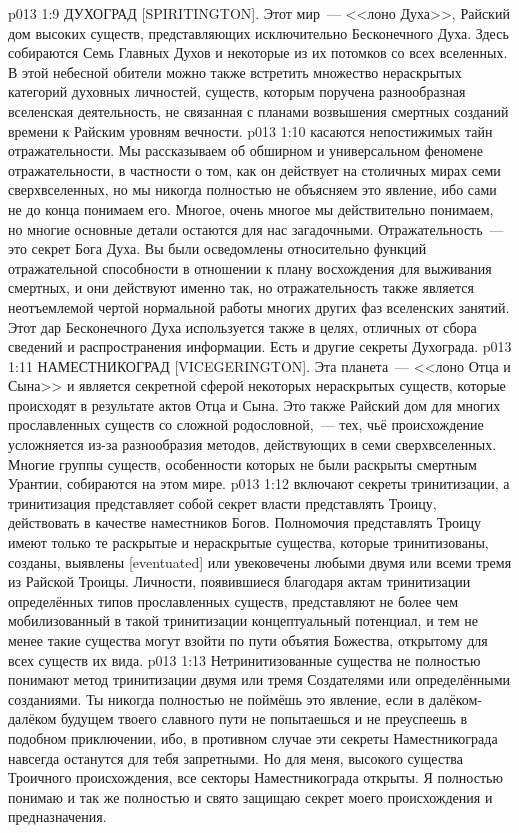\vs p013 1:9 ДУХОГРАД [SPIRITINGTON]. Этот мир~--- <<лоно Духа>>, Райский дом высоких существ, представляющих исключительно Бесконечного Духа. Здесь собираются Семь Главных Духов и некоторые из их потомков со всех вселенных. В этой небесной обители можно также встретить множество нераскрытых категорий духовных личностей, существ, которым поручена разнообразная вселенская деятельность, не связанная с планами возвышения смертных созданий времени к Райским уровням вечности.
\vs p013 1:10 \pc {} касаются непостижимых тайн отражательности. Мы рассказываем об обширном и универсальном феномене отражательности, в частности о том, как он действует на столичных мирах семи сверхвселенных, но мы никогда полностью не объясняем это явление, ибо сами не до конца понимаем его. Многое, очень многое мы действительно понимаем, но многие основные детали остаются для нас загадочными. Отражательность~--- это секрет Бога Духа. Вы были осведомлены относительно функций отражательной способности в отношении к плану восхождения для выживания смертных, и они действуют именно так, но отражательность также является неотъемлемой чертой нормальной работы многих других фаз вселенских занятий. Этот дар Бесконечного Духа используется также в целях, отличных от сбора сведений и распространения информации. Есть и другие секреты Духограда.
\vs p013 1:11 НАМЕСТНИКОГРАД [VICEGERINGTON]. Эта планета~--- <<лоно Отца и Сына>> и является секретной сферой некоторых нераскрытых существ, которые происходят в результате актов Отца и Сына. Это также Райский дом для многих прославленных существ со сложной родословной,~--- тех, чьё происхождение усложняется из\hyp{}за разнообразия методов, действующих в семи сверхвселенных. Многие группы существ, особенности которых не были раскрыты смертным Урантии, собираются на этом мире.
\vs p013 1:12 \pc {} включают секреты тринитизации, а тринитизация представляет собой секрет власти представлять Троицу, действовать в качестве наместников Богов. Полномочия представлять Троицу имеют только те раскрытые и нераскрытые существа, которые тринитизованы, созданы, выявлены [eventuated] или увековечены любыми двумя или всеми тремя из Райской Троицы. Личности, появившиеся благодаря актам тринитизации определённых типов прославленных существ, представляют не более чем мобилизованный в такой тринитизации концептуальный потенциал, и тем не менее такие существа могут взойти по пути объятия Божества, открытому для всех существ их вида.
\vs p013 1:13 Нетринитизованные существа не полностью понимают метод тринитизации двумя или тремя Создателями или определёнными созданиями. Ты никогда полностью не поймёшь это явление, если в далёком\hyp{}далёком будущем твоего славного пути не попытаешься и не преуспеешь в подобном приключении, ибо, в противном случае эти секреты Наместникограда навсегда останутся для тебя запретными. Но для меня, высокого существа Троичного происхождения, все секторы Наместникограда открыты. Я полностью понимаю и так же полностью и свято защищаю секрет моего происхождения и предназначения.
